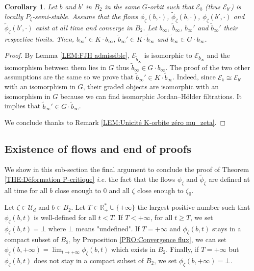 \documentclass{article}
\newtheorem{corollary}[theorem]{Corollary}
\theoremstyle{remark}
\theoremstyle{definition}
\newcommand{\R}{\mathbb{R}}
\newcommand{\E}{\mathcal{E}}
\newcommand{\mU}{\mathcal{U}}
\renewcommand{\geq}{\geqslant}
\begin{document}
\begin{corollary}\label{COR:Unicité de Ness}
    Let $b$ and $b'$ in $B_2$ in the same $G$-orbit such that $\E_b$ (thus $\E_{b'}$) is locally $P_\zeta$-semi-stable. Assume that the flows $\phi_\zeta(b,\cdot)$, $\tilde{\phi}_\zeta(b,\cdot)$, $\phi_\zeta(b',\cdot)$ and $\tilde{\phi}_\zeta(b',\cdot)$ exist at all time and converge in $B_2$. Let $b_\infty$, $\tilde{b}_\infty$, $b_\infty'$ and $\tilde{b}_\infty'$ their respective limits. Then, $b_\infty' \in K \cdot b_\infty$, $\tilde{b}_\infty' \in K \cdot \tilde{b}_\infty$ and $\tilde{b}_\infty \in G \cdot b_\infty$.
\end{corollary}
\begin{proof}
By Lemma \ref{LEM:FJH admissible}, $\E_{\tilde{b}_\infty}$ is isomorphic to $\E_{b_\infty}$ and the isomorphism between them lies in $G$ thus $\tilde{b}_\infty \in G \cdot b_\infty$. The proof of the two other assumptions are the same so we prove that $\tilde{b}_\infty' \in K \cdot \tilde{b}_\infty$. Indeed, since $\E_b \cong \E_{b'}$ with an isomorphism in $G$, their graded objects are isomorphic with an isomorphism in $G$ because we can find isomorphic Jordan--Hölder filtrations. It implies that $\tilde{b}_\infty' \in G \cdot \tilde{b}_\infty$.

We conclude thanks to Remark \ref{LEM:Unicité K-orbite zéro mu_zeta}.
\end{proof}

\subsection{Existence of flows and end of proofs}

We show in this sub-section the final argument to conclude the proof of Theorem \ref{THE:Déformation P-critique} \textit{i.e.} the fact that the flows $\phi_\zeta$ and $\tilde{\phi}_\zeta$ are defined at all time for all $b$ close enough to $0$ and all $\zeta$ close enough to $\zeta_0$.

Let $\zeta \in \mU_d$ and $b \in B_2$. Let $T \in \R_+^* \cup \{+\infty\}$ the largest positive number such that $\phi_\zeta(b,t)$ is well-defined for all $t < T$. If $T < +\infty$, for all $t \geq T$, we set $\phi_\zeta(b,t) = \bot$ where $\bot$ means "undefined". If $T = +\infty$ and $\phi_\zeta(b,t)$ stays in a compact subset of $B_2$, by Proposition \ref{PRO:Convergence flux}, we can set $\phi_\zeta(b,+\infty) = \lim_{t \rightarrow +\infty} \phi_\zeta(b,t)$ which exists in $B_2$. Finally, if $T = +\infty$ but $\phi_\zeta(b,t)$ does not stay in a compact subset of $B_2$, we set $\phi_\zeta(b,+\infty) = \bot$.
\end{document}

